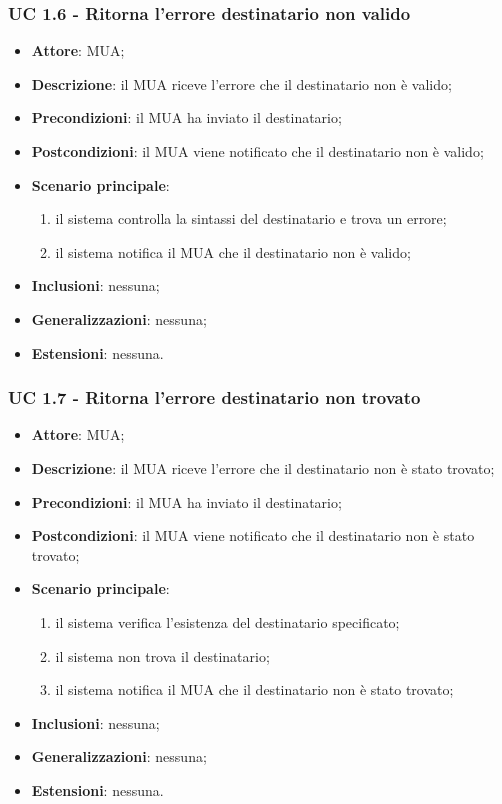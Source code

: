     \subsubsection{UC 1.6 - Ritorna l'errore destinatario non valido} \label{sec:UC1.6}
    \begin{itemize}
        \item \textbf{Attore}: MUA;
        \item \textbf{Descrizione}: il MUA riceve l'errore che il destinatario non è valido;
        \item \textbf{Precondizioni}: il MUA ha inviato il destinatario;
        \item \textbf{Postcondizioni}: il MUA viene notificato che il destinatario non è valido;
        \item \textbf{Scenario principale}:
            \begin{enumerate}
                \item il sistema controlla la sintassi del destinatario e trova un errore;
                \item il sistema notifica il MUA che il destinatario non è valido;
            \end{enumerate}
        \item \textbf{Inclusioni}: nessuna;
        \item \textbf{Generalizzazioni}: nessuna;
        \item \textbf{Estensioni}: nessuna.
    \end{itemize}


    \subsubsection{UC 1.7 - Ritorna l'errore destinatario non trovato} \label{sec:UC1.7}
    \begin{itemize}
        \item \textbf{Attore}: MUA;
        \item \textbf{Descrizione}: il MUA riceve l'errore che il destinatario non è stato trovato;
        \item \textbf{Precondizioni}: il MUA ha inviato il destinatario;
        \item \textbf{Postcondizioni}: il MUA viene notificato che il destinatario non è stato trovato;
        \item \textbf{Scenario principale}:
            \begin{enumerate}
                \item il sistema verifica l'esistenza del destinatario specificato;
                \item il sistema non trova il destinatario;
                \item il sistema notifica il MUA che il destinatario non è stato trovato;
            \end{enumerate}
        \item \textbf{Inclusioni}: nessuna;
        \item \textbf{Generalizzazioni}: nessuna;
        \item \textbf{Estensioni}: nessuna.
    \end{itemize}

